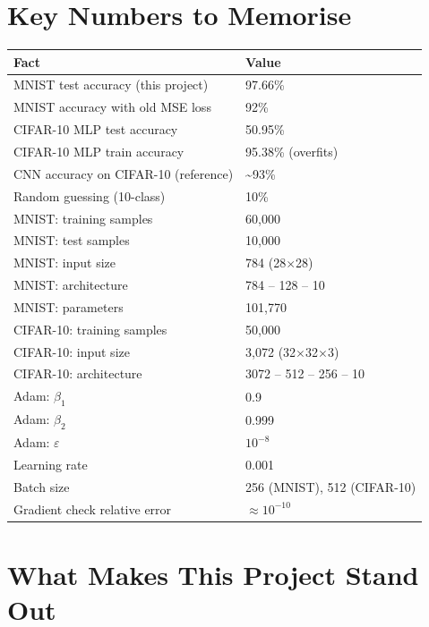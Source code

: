 \documentclass[12pt, a4paper]{article}
\begin{document}
\section{Key Numbers to Memorise}

\begin{center}
\begin{tabular}{ll}
  \toprule
  \textbf{Fact} & \textbf{Value} \\
  \midrule
  MNIST test accuracy (this project) & 97.66\% \\
  MNIST accuracy with old MSE loss & 92\% \\
  CIFAR-10 MLP test accuracy & 50.95\% \\
  CIFAR-10 MLP train accuracy & 95.38\% (overfits) \\
  CNN accuracy on CIFAR-10 (reference) & \textasciitilde93\% \\
  Random guessing (10-class) & 10\% \\
  \midrule
  MNIST: training samples & 60,000 \\
  MNIST: test samples & 10,000 \\
  MNIST: input size & 784 (28$\times$28) \\
  MNIST: architecture & 784 -- 128 -- 10 \\
  MNIST: parameters & 101,770 \\
  \midrule
  CIFAR-10: training samples & 50,000 \\
  CIFAR-10: input size & 3,072 (32$\times$32$\times$3) \\
  CIFAR-10: architecture & 3072 -- 512 -- 256 -- 10 \\
  \midrule
  Adam: $\beta_1$ & 0.9 \\
  Adam: $\beta_2$ & 0.999 \\
  Adam: $\varepsilon$ & $10^{-8}$ \\
  Learning rate & 0.001 \\
  Batch size & 256 (MNIST), 512 (CIFAR-10) \\
  Gradient check relative error & $\approx 10^{-10}$ \\
  \bottomrule
\end{tabular}
\end{center}

\section{What Makes This Project Stand Out}
\end{document}
